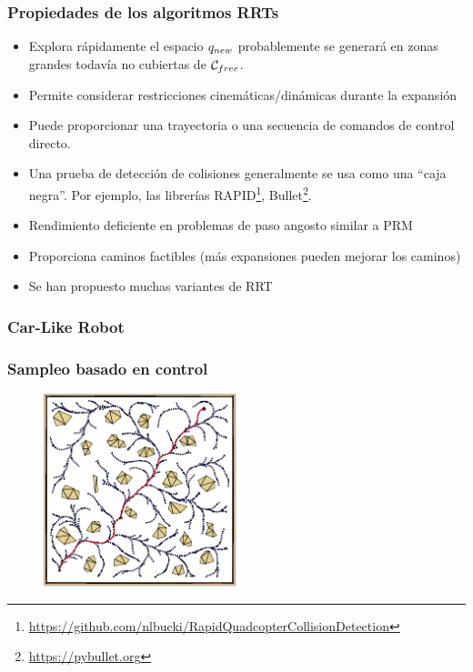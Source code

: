 \begin{frame}
	\frametitle{Propiedades de los algoritmos RRTs}

	\begin{itemize}
		\item Explora rápidamente el espacio $q_{new}$ probablemente se generará en zonas grandes todavía no cubiertas de $\mathcal{C}_{free}$.
		\item Permite considerar restricciones cinemáticas/dinámicas durante la expansión
		\item Puede proporcionar una trayectoria o una secuencia de comandos de control directo.
		\item Una prueba de detección de colisiones generalmente se usa como una ``caja negra''. Por ejemplo, las librerías RAPID\footnote{\url{https://github.com/nlbucki/RapidQuadcopterCollisionDetection}}, Bullet\footnote{\url{https://pybullet.org}}.
		\item Rendimiento deficiente en problemas de paso angosto similar a PRM
		\item Proporciona caminos factibles (más expansiones pueden mejorar los caminos)
		\item Se han propuesto muchas variantes de RRT
	\end{itemize}
\end{frame}

\begin{frame}
    \frametitle{Car-Like Robot}
    
    
\end{frame}

\begin{frame}
	\frametitle{Sampleo basado en control}
	
	\begin{figure}
		\includegraphics[width=0.5\textwidth]{images/rrt_control_based_sampling.pdf}
	\end{figure}
\end{frame}

